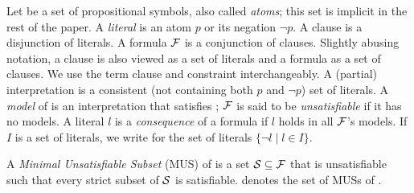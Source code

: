 Let \voc be a set of propositional symbols, also called \emph{atoms}; this set is implicit in the rest of the paper. A \emph{literal} is an atom $p$ or its negation $\lnot p$. 
A clause is a disjunction of literals. A formula $\mathcal{F} $ is a conjunction of clauses. 
Slightly abusing notation, a clause is also viewed as a set of literals and a formula as a set of clauses. We use the term clause and constraint interchangeably.
A (partial) interpretation is a consistent (not containing both $p$ and $\lnot p$) set of literals. 
A \emph{model} of \formula is an interpretation that satisfies \formula; 
$\mathcal{F} $ is said to be \emph{unsatisfiable} if it has no models.
A literal $l$ is a \emph{consequence} of a formula \formula if $l$ holds in all $\mathcal{F} $'s models. %
If $I$ is a set of literals, we write  for the set of literals $\{\lnot l\mid l\in I\}$.

\begin{definition}
  A \emph{Minimal Unsatisfiable Subset} (MUS) of \F is a set $\mathcal{S} \subseteq \mathcal{F} $  that is unsatisfiable such that every strict subset of $\mathcal{S} $ is satisfiable. 
%   
  \muses{\F} denotes the set of MUSs of \F. 
\end{definition}


